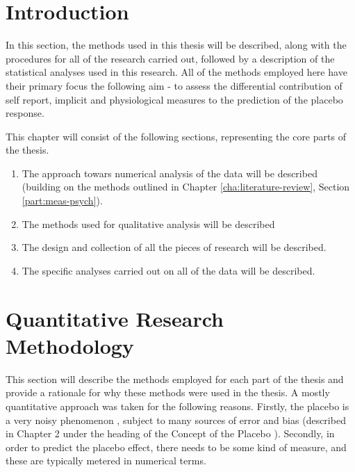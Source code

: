 
\section{Introduction}

In this section, the methods used in this thesis will be described, along with the procedures for all of the research carried out, followed by a description of the statistical analyses used in this research.
All of the methods employed here have their primary focus the following aim - to assess the differential contribution of self report, implicit and physiological measures to the prediction of the placebo response.

This chapter will consist of the following sections, representing the core parts of the thesis.

\begin{enumerate}
\item The approach towars numerical analysis of the data will be described (building on the methods outlined in Chapter \ref{cha:literature-review}, Section \ref{part:meas-psych}). 
\item The methods used for qualitative analysis will be described
\item  The design and collection of all the pieces of research will be described.
\item The specific analyses carried out on all of the data will be described.
\end{enumerate}

\section{Quantitative Research Methodology}
\label{sec:quant-rese-meth}
This section  will describe the methods employed for each part of the thesis and provide a rationale for why these methods were used in the thesis.
A mostly quantitative approach was taken for the following reasons. Firstly, the placebo  is a very noisy phenomenon \cite{Singer2005}, subject to many sources of error and bias (described in Chapter 2 under the heading of the Concept of the Placebo ). Secondly, in order to predict the placebo effect, there needs to be some kind of measure, and these are typically metered in numerical terms. 

